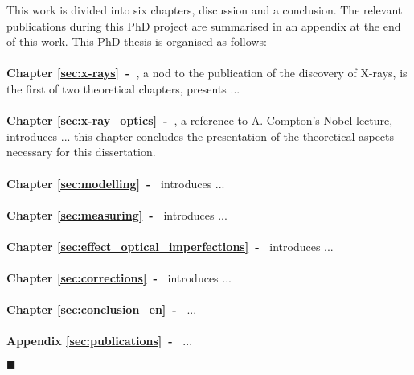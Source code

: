 This work is divided into six chapters, discussion and a conclusion. The relevant publications during this PhD project are summarised in an appendix at the end of this work. This PhD thesis is organised as follows:
\\
\\
\textbf{Chapter \ref{sec:x-rays}~-~}, a nod to the publication of the discovery of X-rays, is the first of two theoretical chapters, presents ...
\\
\\
\textbf{Chapter \ref{sec:x-ray_optics}~-~}, a reference to A. Compton's Nobel lecture, introduces ... this chapter concludes the presentation of the theoretical aspects necessary for this dissertation.
\\
\\
\textbf{Chapter \ref{sec:modelling}~-~} introduces ...
\\
\\
\textbf{Chapter \ref{sec:measuring}~-~} introduces ...
\\
\\
\textbf{Chapter \ref{sec:effect_optical_imperfections}~-~} introduces ...
\\
\\
\textbf{Chapter \ref{sec:corrections}~-~} introduces ...
\\
\\
\textbf{Chapter \ref{sec:conclusion_en}~-~}  ...
\\
\\
\textbf{Appendix \ref{sec:publications}~-~}  ...

$\blacksquare$